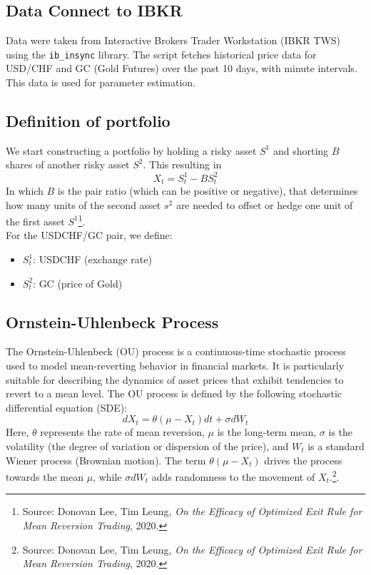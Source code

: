 \documentclass{article}
\begin{document}
\subsection*{Data Connect to IBKR}
Data were taken from Interactive Brokers Trader Workstation (IBKR TWS) using the \texttt{ib\_insync} library.
The script fetches historical price data for USD/CHF and GC (Gold Futures) over the past 10 days, with minute intervals. This data is used for parameter estimation.

\subsection*{Definition of portfolio}
We start constructing a portfolio by holding a risky asset $S^1$ and shorting $B$ shares of another risky asset $S^2$. This resulting in
\begin{equation}
    X_t=S_t^1-BS_t^2
\end{equation}
In which $B$ is the pair ratio (which can be positive or negative), that determines how many units of the second asset $s^2$ are needed to offset or hedge one unit of the first asset $S^1$\footnote{Source: Donovan Lee, Tim Leung, \textit{On the Efficacy of Optimized Exit Rule for Mean Reversion Trading}, 2020.}.\\

For the USDCHF/GC pair, we define:
\begin{itemize}
    \item $S_t^1$: USDCHF (exchange rate)
    \item $S_t^2$: GC (price of Gold)
\end{itemize}

\subsection*{Ornstein-Uhlenbeck Process}
The Ornstein-Uhlenbeck (OU) process is a continuous-time stochastic process used to model mean-reverting behavior in financial markets. It is particularly suitable for describing the dynamics of asset prices that exhibit tendencies to revert to a mean level. The OU process is defined by the following stochastic differential equation (SDE):
\begin{equation}
dX_t = \theta (\mu - X_t) dt + \sigma dW_t
\end{equation}
Here, \( \theta \) represents the rate of mean reversion, \( \mu \) is the long-term mean, \( \sigma \) is the volatility (the degree of variation or dispersion of the price), and \( W_t \) is a standard Wiener process (Brownian motion). The term \( \theta (\mu - X_t) \) drives the process towards the mean \( \mu \), while \( \sigma dW_t \) adds randomness to the movement of \( X_t \).\footnote{Source: Donovan Lee, Tim Leung, \textit{On the Efficacy of Optimized Exit Rule for Mean Reversion Trading}, 2020.}.
\end{document}
